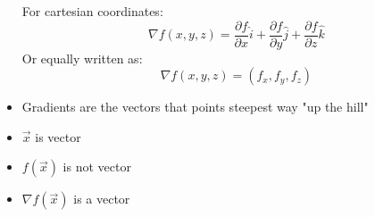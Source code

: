 \begin{itemize}
\begin{example}
\end{example}

\begin{theorem}
	For cartesian coordinates:
	\begin{equation}
		\nabla f(x, y, z) = \frac{\partial f}{\partial x}\hat{i} + \frac{\partial f}{\partial y} \hat{j}+ \frac{\partial f}{\partial z} \hat{k} 
	\end{equation}
	Or equally written as:
	\begin{equation}
		\nabla f(x, y, z) = (f_x, f_y, f_z)  
	\end{equation}
\end{theorem}
\item Gradients are the vectors that points steepest way "up the hill"
\item $\vec{x}$ is vector
\item $f(\vec{x}) $ is not vector
\item $\nabla f(\vec{x}) $ is a vector


\end{itemize}

